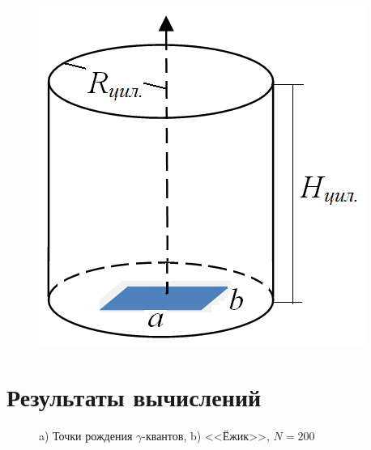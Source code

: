 \documentclass[
11pt,
master, %
subf, %
href, %
colorlinks=true, %
]{disser}
\begin{document}
\begin{figure}[htbp]
  \centering
  \includegraphics[width=0.5\linewidth]{pic1}
  \caption{}\label{}
\end{figure}

\newpage
\section{Результаты вычислений}
\begin{figure}[htbp]
\begin{minipage}[h]{0.3\linewidth}
\end{minipage}
\hfill
\begin{minipage}[h]{0.68\linewidth}
\end{minipage}
\caption{a) Точки рождения $\gamma$-квантов, b) <<Ёжик>>, $N = 200$}
\label{}
\end{figure}
\end{document}
